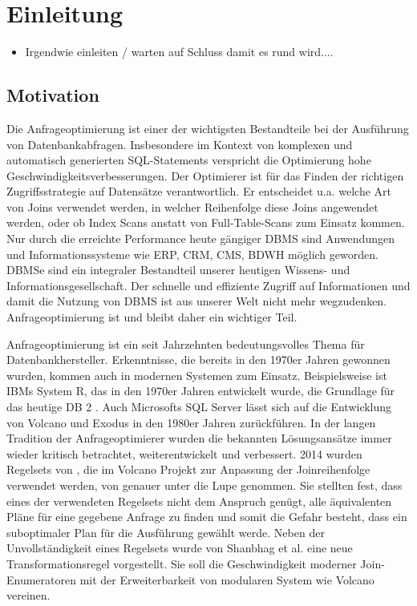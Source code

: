 \chapter{Einleitung}

\begin{itemize}
\item Irgendwie einleiten / warten auf Schluss damit es rund wird....
\end{itemize}



\section{Motivation}


Die Anfrageoptimierung ist einer der wichtigsten Bestandteile bei der Ausführung von Datenbankabfragen. Insbesondere im Kontext von komplexen und automatisch generierten SQL-Statements verspricht die Optimierung hohe Geschwindigkeitsverbesserungen. Der Optimierer ist für das Finden der richtigen Zugriffsstrategie auf Datensätze verantwortlich. Er entscheidet u.a. welche Art von Joins verwendet werden, in welcher Reihenfolge diese Joins angewendet werden, oder ob Index Scans anstatt von Full-Table-Scans zum Einsatz kommen. Nur durch die erreichte Performance heute gängiger \ac{DBMS} sind Anwendungen und Informationssysteme wie \ac{ERP}, \ac{CRM}, \ac{CMS}, \ac{BDWH} möglich geworden. \ac{DBMS}e sind ein integraler Bestandteil unserer heutigen Wissens- und Informationsgesellschaft. Der schnelle und effiziente Zugriff auf Informationen und damit die Nutzung von \ac{DBMS} ist aus unserer Welt nicht mehr wegzudenken. Anfrageoptimierung ist und bleibt daher ein wichtiger Teil.

Anfrageoptimierung ist ein seit Jahrzehnten bedeutungsvolles Thema für Datenbankhersteller. Erkenntnisse, die bereits in den 1970er Jahren gewonnen wurden, kommen auch in modernen Systemen zum Einsatz. Beispielsweise ist IBMs System R, das in den 1970er Jahren entwickelt wurde, die Grundlage für das heutige DB 2  \cite{wade2012ibm}. Auch Microsofts SQL Server lässt sich auf die Entwicklung von Volcano und Exodus in den 1980er Jahren zurückführen.
In der langen Tradition der Anfrageoptimierer wurden die bekannten Lösungsansätze immer wieder kritisch betrachtet, weiterentwickelt und verbessert. 2014 wurden Regelsets von \cite{pellenkoft1997complexity}, die im Volcano Projekt zur Anpassung der Joinreihenfolge verwendet werden, von \cite{shanbhag2014optimizing} genauer unter die Lupe genommen. 
Sie stellten fest, dass eines der verwendeten Regelsets nicht dem Anspruch genügt, alle äquivalenten Pläne für eine gegebene Anfrage zu finden und somit die Gefahr besteht, dass ein suboptimaler Plan für die Ausführung gewählt werde. Neben der Unvollständigkeit eines Regelsets wurde von Shanbhag et al. eine neue Transformationsregel vorgestellt. Sie soll die Geschwindigkeit moderner Join-Enumeratoren mit der Erweiterbarkeit von modularen System wie Volcano vereinen.

